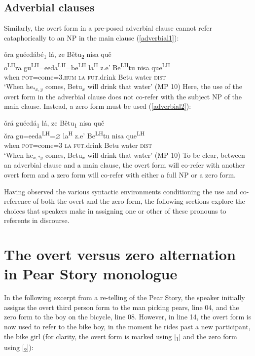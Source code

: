 \subsection{Adverbial clauses}

Similarly, the overt form in a pre-posed adverbial clause cannot refer cataphorically to an NP in the main clause (\ref{adverbial1}):

\ea\label{adverbial1}
\glll \v{o}ra gu\'{e}ed\'{a}b\'{e}\textsubscript{1} l\'{a}, ze B\v{e}tu\textsubscript{2} nisa qu\v{e} \\
o\textsuperscript{LH}ra gu\textsuperscript{LH}=eeda\textsuperscript{LH}=be\textsuperscript{LH}  la\textsuperscript{H} z.e' Be\textsuperscript{LH}tu nisa que\textsuperscript{LH} \\
when \textsc{pot}=come=\textsc{3.hum} \textsc{la} \textsc{fut}.drink Betu water  \textsc{dist} \\
\glt `When he$_{*x, y}$ comes, Betu$_{x}$ will drink that water'  \hfill{(MP 10)}
\z
Here, the use of the overt form in the adverbial clause does not co-refer with the subject NP of the main clause. Instead, a zero form must be used (\ref{adverbial2}):

\ea\label{adverbial2}
\glll \v{o}r\'{a} gu\'{e}ed\'{a}\textsubscript{1} l\'{a}, ze B\v{e}tu\textsubscript{1} nisa qu\v{e} \\
\v{o}ra gu=eeda\textsuperscript{LH}={$\varnothing$} la\textsuperscript{H} z.e' Be\textsuperscript{LH}tu nisa que\textsuperscript{LH} \\
when \textsc{pot}=come=\textsc{3} \textsc{la} \textsc{fut}.drink Betu water  \textsc{dist} \\
\glt `When he$_{x, *y}$ comes, Betu$_{x}$ will drink that water' \hfill{(MP 10)}
\z
To be clear, between an adverbial clause and a main clause, the overt form will co-refer with another overt form and a zero form will co-refer with either a full NP or a zero form. 

Having observed the various syntactic environments conditioning the use and co-reference of both the overt and the zero form, the following sections explore the choices that speakers make in assigning one or other of these pronouns to referents in discourse.


\section{The overt versus zero alternation in Pear Story monologue}

In the following excerpt from a re-telling of the Pear Story, the speaker initially assigns the overt third person form to the man picking pears, line 04, and the zero form to the boy on the bicycle, line 08. However, in line 14, the overt form is now used to refer to the bike boy, in the moment he rides past a new participant, the bike girl (for clarity, the overt form is marked using [\textsubscript{1}] and the zero form using [\textsubscript{2}]):


